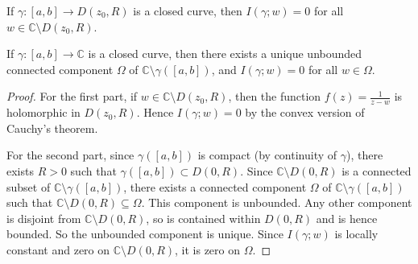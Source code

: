 \begin{proposition}
	If \( \gamma \colon [a,b] \to D(z_0, R) \) is a closed curve, then \( I(\gamma;w) = 0 \) for all \( w \in \mathbb C \setminus D(z_0,R) \).

	If \( \gamma \colon [a,b] \to \mathbb C \) is a closed curve, then there exists a unique unbounded connected component \( \Omega \) of \( \mathbb C \setminus \gamma([a,b]) \), and \( I(\gamma;w) = 0 \) for all \( w \in \Omega \).
\end{proposition}
\begin{proof}
	For the first part, if \( w \in \mathbb C \setminus D(z_0, R) \), then the function \( f(z) = \frac{1}{z-w} \) is holomorphic in \( D(z_0,R) \).
	Hence \( I(\gamma;w) = 0 \) by the convex version of Cauchy's theorem.

	For the second part, since \( \gamma([a,b]) \) is compact (by continuity of \( \gamma \)), there exists \( R > 0 \) such that \( \gamma([a,b]) \subset D(0,R) \).
	Since \( \mathbb C \setminus D(0,R) \) is a connected subset of \( \mathbb C \setminus \gamma([a,b]) \), there exists a connected component \( \Omega \) of \( \mathbb C \setminus \gamma([a,b]) \) such that \( \mathbb C \setminus D(0,R) \subseteq \Omega \).
	This component is unbounded.
	Any other component is disjoint from \( \mathbb C \setminus D(0,R) \), so is contained within \( D(0,R) \) and is hence bounded.
	So the unbounded component is unique.
	Since \( I(\gamma;w) \) is locally constant and zero on \( \mathbb C \setminus D(0,R) \), it is zero on \( \Omega \).
\end{proof}

